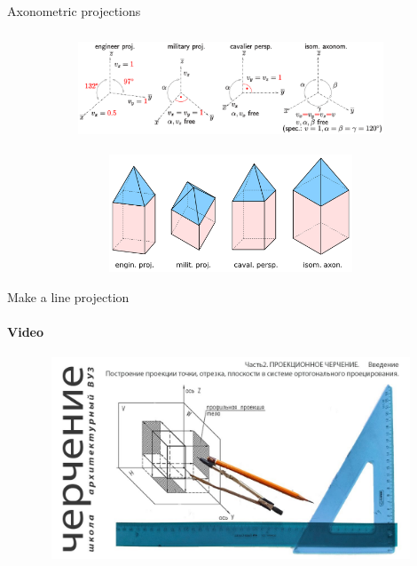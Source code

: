 \documentclass[aspectratio=169]{beamer}
\begin{document}
\begin{frame}[t]{Axonometric projections}
    \framesubtitle{}
    \vspace{-0.6cm}
    \begin{figure}[H]
        \begin{subfigure}{0.99\textwidth}
            \centering\includegraphics[height=3cm,width=1\textwidth,keepaspectratio]{resources/proj_types_1.png}
            \label{fig:resources/proj_types_1.png}
        \end{subfigure}

        \begin{subfigure}{0.99\textwidth}
            \centering\includegraphics[height=3.5cm,width=1\textwidth,keepaspectratio]{resources/proj_types_2.png}
            \label{fig:resources/proj_types_2.png}
        \end{subfigure}
    \end{figure}
\end{frame}

\begin{frame}[t]{Make a line projection}
    \framesubtitle{Video}
    \vspace{-0.6cm}
    \begin{figure}[H]
        \href{https://youtu.be/M21dLeCLWZ8?t=450}{
            \centering\includegraphics[height=6cm,width=1\textwidth,keepaspectratio]{resources/create_proj_video.jpg}}
        \label{fig:resources/create_proj_video.jpg}
    \end{figure}
\end{frame}
\end{document}
